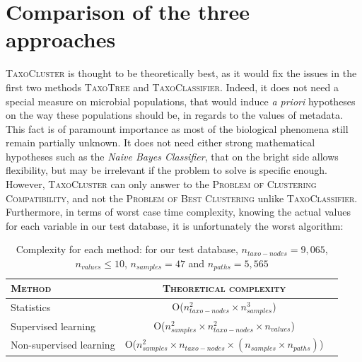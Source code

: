 \documentclass{report}
\begin{document}

\newpage

\chapter{Comparison of the three approaches}

\textsc{TaxoCluster} is thought to be theoretically best, as it would fix the issues in the first two methods \textsc{TaxoTree} and \textsc{TaxoClassifier}. Indeed, it does not need a special measure on microbial populations, that would induce \emph{a priori} hypotheses on the way these populations should be, in regards to the values of metadata. This fact is of paramount importance as most of the biological phenomena still remain partially unknown. It does not need either strong mathematical hypotheses such as the \emph{Naive Bayes Classifier}, that on the bright side allows flexibility, but may be irrelevant if the problem to solve is specific enough. However, \textsc{TaxoCluster} can only answer to the \textsc{Problem of Clustering Compatibility}, and not the \textsc{Problem of Best Clustering} unlike \textsc{TaxoClassifier}. Furthermore, in terms of worst case time complexity, knowing the actual values for each variable in our test database, it is unfortunately the worst algorithm:\\

    \begin{table}
      \caption{Complexity for each method: for our test database, $n_{taxo-nodes} = 9,065$, $n_{values} \le 10$, $n_{samples} = 47$ and $n_{paths} = 5,565$}
      \begin{tabular}{|l|c|r|}
        \hline
        \textsc{Method} & \textsc{Theoretical complexity} \\
        \hline
        Statistics & O($n_{taxo-nodes}^{2} \times n_{samples}^{3}$)\\
        \hline
        Supervised learning & O($n_{samples}^{2} \times n_{taxo-nodes}^{2} \times n_{values}$)\\
        \hline
        Non-supervised learning & O($n_{samples}^{2} \times n_{taxo-nodes}\times (n_{samples} \times n_{paths})$)\\
        \hline
      \end{tabular}
    \end{table}
\end{document}
